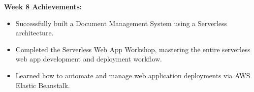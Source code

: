 \vspace{0.5em}\noindent\textbf{Week 8 Achievements:}\par

\begin{itemize}
\tightlist
\item
  Successfully built a Document Management System using a Serverless
  architecture.
\item
  Completed the Serverless Web App Workshop, mastering the entire
  serverless web app development and deployment workflow.
\item
  Learned how to automate and manage web application deployments via AWS
  Elastic Beanstalk.
\end{itemize}
